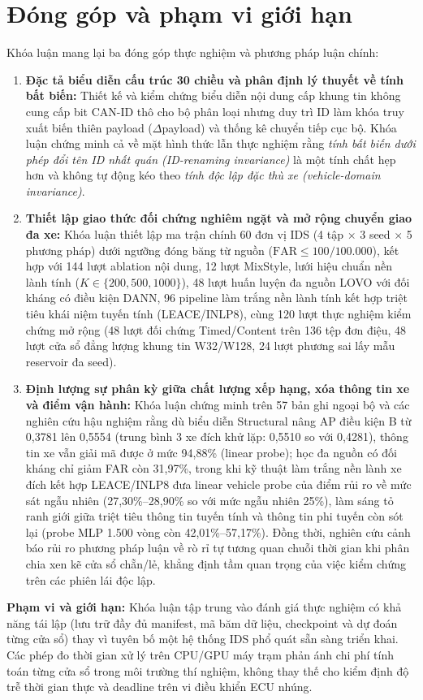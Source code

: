 \documentclass[12pt, a4paper, reqno, oneside]{book}
\newcommand\sect[1]{%
  \Needspace{5\baselineskip}%
  \phantomsection%
  \addcontentsline{toc}{section}{#1}%
  \section*{#1}%
}
\begin{document}
\sect{Đóng góp và phạm vi giới hạn}
Khóa luận mang lại ba đóng góp thực nghiệm và phương pháp luận chính:
\begin{enumerate}
\item \textbf{Đặc tả biểu diễn cấu trúc 30 chiều và phân định lý thuyết về tính bất biến:} Thiết kế và kiểm chứng biểu diễn nội dung cấp khung tin không cung cấp bit CAN-ID thô cho bộ phân loại nhưng duy trì ID làm khóa truy xuất biến thiên payload ($\Delta$payload) và thống kê chuyển tiếp cục bộ. Khóa luận chứng minh cả về mặt hình thức lẫn thực nghiệm rằng \textit{tính bất biến dưới phép đổi tên ID nhất quán (ID-renaming invariance)} là một tính chất hẹp hơn và không tự động kéo theo \textit{tính độc lập đặc thù xe (vehicle-domain invariance)}.
\item \textbf{Thiết lập giao thức đối chứng nghiêm ngặt và mở rộng chuyển giao đa xe:} Khóa luận thiết lập ma trận chính 60 đơn vị IDS (4 tập $\times$ 3 seed $\times$ 5 phương pháp) dưới ngưỡng đóng băng từ nguồn ($\text{FAR} \le 100/100.000$), kết hợp với 144 lượt ablation nội dung, 12 lượt MixStyle, lưới hiệu chuẩn nền lành tính ($K \in \{200, 500, 1000\}$), 48 lượt huấn luyện đa nguồn LOVO với đối kháng có điều kiện DANN, 96 pipeline làm trắng nền lành tính kết hợp triệt tiêu khái niệm tuyến tính (LEACE/INLP8), cùng 120 lượt thực nghiệm kiểm chứng mở rộng (48 lượt đối chứng Timed/Content trên 136 tệp đơn điệu, 48 lượt cửa sổ đẳng lượng khung tin W32/W128, 24 lượt phương sai lấy mẫu reservoir đa seed).
\item \textbf{Định lượng sự phân kỳ giữa chất lượng xếp hạng, xóa thông tin xe và điểm vận hành:} Khóa luận chứng minh trên 57 bản ghi ngoại bộ và các nghiên cứu hậu nghiệm rằng dù biểu diễn Structural nâng AP điều kiện B từ 0,3781 lên 0,5554 (trung bình 3 xe đích khử lặp: 0,5510 so với 0,4281), thông tin xe vẫn giải mã được ở mức 94,88\% (linear probe); học đa nguồn có đối kháng chỉ giảm FAR còn 31,97\%, trong khi kỹ thuật làm trắng nền lành xe đích kết hợp LEACE/INLP8 đưa linear vehicle probe của điểm rủi ro về mức sát ngẫu nhiên (27,30\%--28,90\% so với mức ngẫu nhiên 25\%), làm sáng tỏ ranh giới giữa triệt tiêu thông tin tuyến tính và thông tin phi tuyến còn sót lại (probe MLP 1.500 vòng còn 42,01\%--57,17\%). Đồng thời, nghiên cứu cảnh báo rủi ro phương pháp luận về rò rỉ tự tương quan chuỗi thời gian khi phân chia xen kẽ cửa sổ chẵn/lẻ, khẳng định tầm quan trọng của việc kiểm chứng trên các phiên lái độc lập.
\end{enumerate}

\noindent\textbf{Phạm vi và giới hạn:} Khóa luận tập trung vào đánh giá thực nghiệm có khả năng tái lập (lưu trữ đầy đủ manifest, mã băm dữ liệu, checkpoint và dự đoán từng cửa sổ) thay vì tuyên bố một hệ thống IDS phổ quát sẵn sàng triển khai. Các phép đo thời gian xử lý trên CPU/GPU máy trạm phản ánh chi phí tính toán từng cửa sổ trong môi trường thí nghiệm, không thay thế cho kiểm định độ trễ thời gian thực và deadline trên vi điều khiển ECU nhúng.
\end{document}

